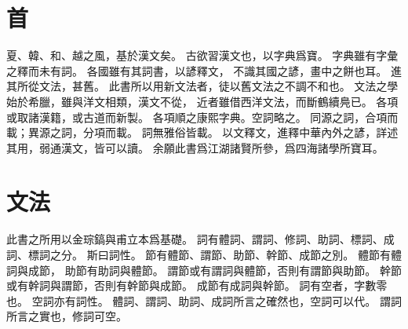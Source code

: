 \chapter*{首}
夏、韓、和、越之風，基於漢文矣。
古欲習漢文也，以字典爲寶。
字典雖有字彙之釋而未有詞。
各國雖有其詞書，以諺釋文，
不識其國之諺，畫中之餅也耳。
進其所從文法，甚舊。
此書所以用新文法者，徒以舊文法之不調不和也。
文法之學始於希臘，雖與洋文相類，漢文不從，
近者雖借西洋文法，而斷鶴續鳧已\parencite{Ahn:2012}。
各項或取諸漢籍，或古道而新製。
各項順之康熙字典。空詞略之。
同源之詞，合項而載；異源之詞，分項而載。
詞無雅俗皆載。
以文釋文，進釋中華內外之諺，詳述其用，弱通漢文，皆可以讀。
余願此書爲江湖諸賢所參，爲四海諸學所寶耳。
\chapter*{文法}
此書之所用以金琮鎬與甫立本爲基礎。
詞有體詞、謂詞、修詞、助詞、標詞、成詞、標詞之分\parencites[43-4]{Pulleyblank:2005}[2-35]{Kim:2019}。
斯曰詞性。
節有體節、謂節、助節、幹節、成節之別\parencite[15]{Kim:2019}。
體節有體詞與成節，
助節有助詞與體節。
謂節或有謂詞與體節，否則有謂節與助節。
幹節或有幹詞與謂節，否則有幹節與成節。
成節有成詞與幹節。
詞有空者，字數零也\parencite[2]{Kim:2019}。
空詞亦有詞性。
體詞、謂詞、助詞、成詞所言之確然也，空詞可以代。
謂詞所言之實也，修詞可空。
